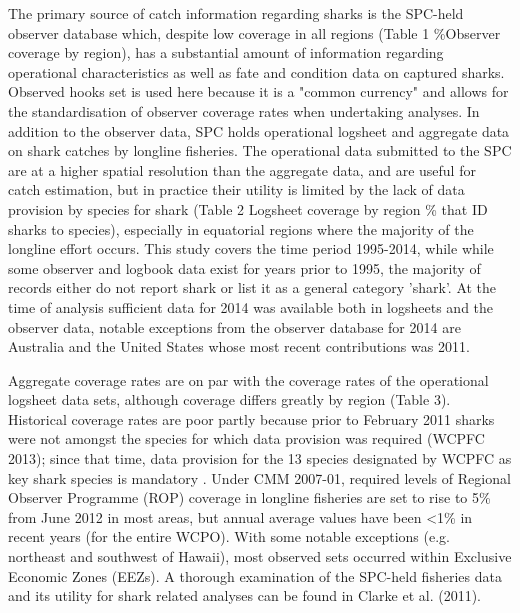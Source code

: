\documentclass[12pt]{SCreport}
\begin{document}
The primary source of catch information regarding sharks is the SPC-held observer database which, despite low coverage in all regions (Table 1 \%Observer coverage by region), has a substantial amount of information regarding operational characteristics as well as fate and condition data on captured sharks. Observed hooks set is used here because it is a "common currency" and allows for the standardisation of observer coverage rates when undertaking analyses.  In addition to the observer data, SPC holds operational logsheet and aggregate data on shark catches by longline fisheries. The operational data submitted to the SPC are at a higher spatial resolution than the aggregate data, and are useful for catch estimation, but in practice their utility is limited by the lack of data provision by species for shark (Table 2 Logsheet coverage by region \% that ID sharks to species), especially in equatorial regions where the majority of the longline effort occurs. 
This study covers the time period 1995-2014, while while some observer and logbook data exist for years prior to 1995, the majority of records either do not report shark or list it as a general category 'shark'.  At the time of analysis sufficient data for 2014 was available both in logsheets and the observer data, notable exceptions from the observer database for  2014 are Australia and the United States whose most recent contributions was 2011.

Aggregate coverage rates are on par with the coverage rates of the operational logsheet data sets, although coverage differs greatly by region (Table 3). Historical coverage rates are poor partly because prior to February 2011 sharks were not amongst the species for which data provision was required (WCPFC 2013); since that time, data provision for the 13 species designated by WCPFC as key shark species is mandatory . Under CMM 2007-01, required levels of Regional Observer Programme (ROP) coverage in longline fisheries are set to rise to 5\% from June 2012 in most areas, but annual average values have been <1\% in recent years (for the entire WCPO). With some notable exceptions (e.g. northeast and southwest of Hawaii), most observed sets occurred within Exclusive Economic Zones (EEZs). A thorough examination of the SPC-held fisheries data and its utility for shark related analyses can be found in Clarke et al. (2011).
\end{document}
